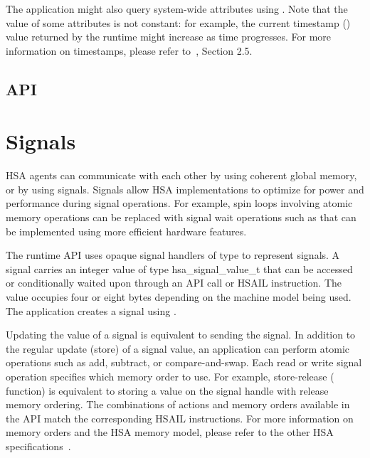 \documentclass[final]{book}
\newcommand{\reftyp}[1]{#1}
\begin{document}
The application might also query system-wide attributes using
. Note that the value of some attributes is not
constant: for example, the current timestamp
() value returned by the runtime might
increase as time progresses. For more information on timestamps, please refer
to~\cite{sar}, Section 2.5.

\subsection{API}


\section{Signals}\label{sec:signals}

HSA agents can communicate with each other by using coherent global memory, or
by using signals. Signals allow HSA implementations to optimize for power and
performance during signal operations. For example, spin loops involving atomic
memory operations can be replaced with signal wait operations such as
 that can be implemented using more efficient
hardware features.

The runtime API uses opaque signal handlers of type  to
represent signals. A signal carries an integer value of type
\reftyp{hsa_signal_value_t} that can be accessed or conditionally waited upon
through an API call or HSAIL instruction. The value occupies four or eight bytes
depending on the machine model being used. The application creates a signal
using .

Updating the value of a signal is equivalent to sending the signal. In addition
to the regular update (store) of a signal value, an application can perform
atomic operations such as add, subtract, or compare-and-swap. Each read or write
signal operation specifies which memory order to use. For example, store-release
( function) is equivalent to storing a value on
the signal handle with release memory ordering. The combinations of actions and
memory orders available in the API match the corresponding HSAIL
instructions. For more information on memory orders and the HSA memory model,
please refer to the other HSA specifications~\cite{prm, sar}.
\end{document}
